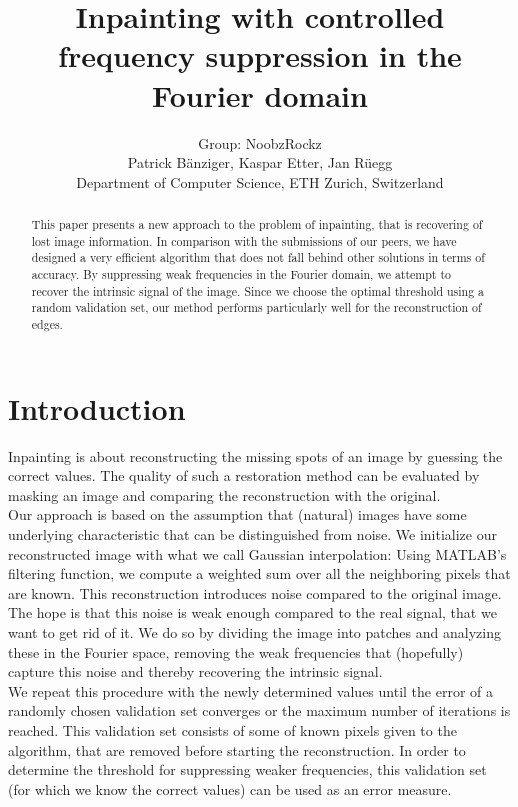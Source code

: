 \documentclass[10pt,conference,compsocconf]{IEEEtran}
\begin{document}
\title{Inpainting with controlled frequency suppression in the Fourier domain}

\author{
  Group: NoobzRockz\\
  Patrick Bänziger, Kaspar Etter, Jan Rüegg\\
  Department of Computer Science, ETH Zurich, Switzerland
}

\maketitle

\begin{abstract}
This paper presents a new approach to the problem of inpainting, that is recovering of lost image information. In comparison with the submissions of our peers, we have designed a very efficient algorithm that does not fall behind other solutions in terms of accuracy. By suppressing weak frequencies in the Fourier domain, we attempt to recover the intrinsic signal of the image. Since we choose the optimal threshold using a random validation set, our method performs particularly well for the reconstruction of edges.
\end{abstract}

\section{Introduction}
Inpainting is about reconstructing the missing spots of an image by guessing the correct values. The quality of such a restoration method can be evaluated by masking an image and comparing the reconstruction with the original.\\
Our approach is based on the assumption that (natural) images have some underlying characteristic that can be distinguished from noise. We initialize our reconstructed image with what we call Gaussian interpolation: Using MATLAB's filtering function, we compute a weighted sum over all the neighboring pixels that are known. This reconstruction introduces noise compared to the original image. The hope is that this noise is weak enough compared to the real signal, that we want to get rid of it. We do so by dividing the image into patches and analyzing these in the Fourier space, removing the weak frequencies that (hopefully) capture this noise and thereby recovering the intrinsic signal.\\
We repeat this procedure with the newly determined values until the error of a randomly chosen validation set converges or the maximum number of iterations is reached. This validation set consists of some of known pixels given to the algorithm, that are removed before starting the reconstruction. In order to determine the  threshold for suppressing weaker frequencies, this validation set (for which we know the correct values) can be used as an error measure.
\end{document}
